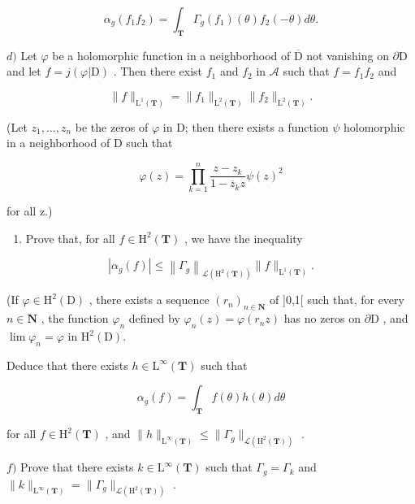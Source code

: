 \[
\alpha_ {g} (f _ {1} f _ {2}) = \int_ {\mathbf {T}} \Gamma_ {g} (f _ {1}) (\theta) f _ {2} (- \theta) d \theta .
\]

\(d)\) Let \(\varphi\) be a holomorphic function in a neighborhood of \(\overline{\mathrm{D}}\) not vanishing on \(\partial\mathrm{D}\) and let \(f = j(\varphi|\mathrm{D})\) . Then there exist \(f_{1}\) and \(f_{2}\) in \(\mathscr{A}\) such that \(f = f_{1}f_{2}\) and

\[
\| f \| _ {\mathrm{L} ^ {1} (\mathbf {T})} = \| f _ {1} \| _ {\mathrm{L} ^ {2} (\mathbf {T})} \| f _ {2} \| _ {\mathrm{L} ^ {2} (\mathbf {T})}.
\]

(Let \(z_{1},\ldots,z_{n}\) be the zeros of \(\varphi\) in D; then there exists a function \(\psi\) holomorphic in a neighborhood of D such that

\[
\varphi (z) = \prod_ {k = 1} ^ {n} \frac {z - z _ {k}}{1 - \overline {{z}} _ {k} z} \psi (z) ^ {2}
\]

for all z.)

\begin{enumerate}
\def\labelenumi{\alph{enumi})}
\setcounter{enumi}{4}
\tightlist
\item
  Prove that, for all \(f \in \mathrm{H}^{2}(\mathbf{T})\) , we have the inequality
\end{enumerate}

\[
\left| \alpha_ {g} (f) \right| \leqslant \left\| \Gamma_ {g} \right\| _ {\mathscr {L} \left(\mathrm{H} ^ {2} (\mathbf {T})\right)} \| f \| _ {\mathrm{L} ^ {1} (\mathbf {T})}.
\]

(If \(\varphi \in \mathrm{H}^2 (\mathrm{D})\) , there exists a sequence \((r_n)_{n\in \mathbf{N}}\) of ]0,1[ such that, for every \(n\in \mathbf{N}\) , the function \(\varphi_{n}\) defined by \(\varphi_{n}(z) = \varphi (r_{n}z)\) has no zeros on \(\partial \mathrm{D}\) , and \(\lim \varphi_n = \varphi\) in \(\mathrm{H}^2 (\mathrm{D}).\)

Deduce that there exists \(h \in \mathrm{L}^{\infty}(\mathbf{T})\) such that

\[
\alpha_ {g} (f) = \int_ {\mathbf {T}} f (\theta) h (\theta) d \theta
\]

for all \(f \in \mathrm{H}^2(\mathbf{T})\) , and \(\|h\|_{\mathrm{L}^\infty(\mathbf{T})} \leqslant \| \Gamma_g \|_{\mathcal{L}(\mathrm{H}^2(\mathbf{T}))}\) .

\(f)\) Prove that there exists \(k \in \mathrm{L}^{\infty}(\mathbf{T})\) such that \(\Gamma_g = \Gamma_k\) and \(\| k \|_{\mathrm{L}^{\infty}(\mathbf{T})} = \| \Gamma_g \|_{\mathcal{L}(\mathrm{H}^2(\mathbf{T}))}\) .

